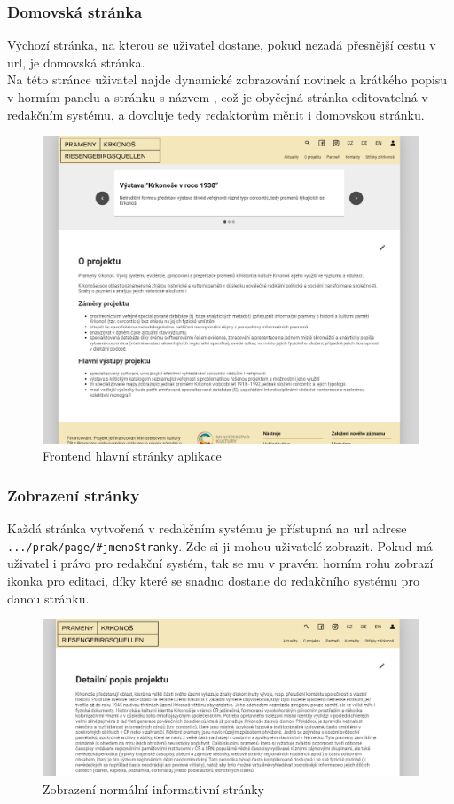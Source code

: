 \subsubsection{Domovská stránka}
Výchozí stránka, na kterou se uživatel dostane, pokud nezadá přesnější cestu v url, je domovská stránka.\\
Na této stránce uživatel najde dynamické zobrazování novinek a krátkého popisu v hormím panelu a stránku
s názvem , což je obyčejná stránka editovatelná v redakčním systému, a dovoluje tedy
redaktorům měnit i domovskou stránku.
\begin{figure}[H]
	\centering
	\includegraphics[width=.8\linewidth]{img/homeScene.png}
	\caption{Frontend hlavní stránky aplikace}
\end{figure}

\subsubsection{Zobrazení stránky}
Každá stránka vytvořená v redakčním systému je přístupná na url adrese \texttt{.../prak/page/\#jmenoStranky}.
Zde si ji mohou uživatelé zobrazit. Pokud má uživatel i právo pro redakční systém,
tak se mu v pravém horním rohu zobrazí ikonka pro editaci, díky které se snadno dostane do
redakčního systému pro danou stránku.
\begin{figure}[H]
	\centering
	\includegraphics[width=.8\linewidth]{img/pageScene.png}
	\caption{Zobrazení normální informativní stránky}
\end{figure}

